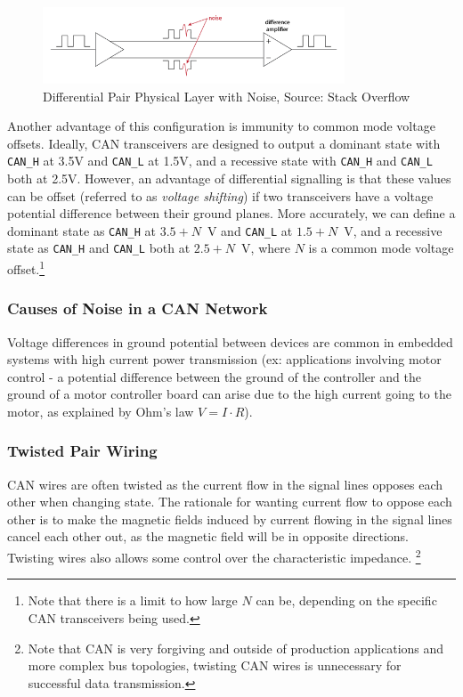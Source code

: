 \documentclass[main.tex]{subfiles}
\begin{document}
\begin{figure}[H]
    \centering
    \includegraphics[width=0.8\textwidth]{images/diff_pair_noise_immunity.png}
    \caption{Differential Pair Physical Layer with Noise, Source: Stack Overflow \cite{stackoverflow_diff_pair_noise}}
    \label{fig:diff-physical-layer-noise}
\end{figure}

\noindent Another advantage of this configuration is immunity to common mode voltage offsets. Ideally, CAN transceivers are designed to output a dominant state with \texttt{CAN\_H} at 3.5V and \texttt{CAN\_L} at 1.5V, and a recessive state with \texttt{CAN\_H} and \texttt{CAN\_L} both at 2.5V. However, an advantage of differential signalling is that these values can be offset (referred to as \textit{voltage shifting}) if two transceivers have a voltage potential difference between their ground planes. More accurately, we can define a dominant state as \texttt{CAN\_H} at \(3.5 + N\)~V and \texttt{CAN\_L} at \(1.5 + N\)~V, and a recessive state as \texttt{CAN\_H} and \texttt{CAN\_L} both at \(2.5 + N\)~V, where $N$ is a common mode voltage offset.\footnote{Note that there is a limit to how large $N$ can be, depending on the specific CAN transceivers being used.} \newline

\subsubsection{Causes of Noise in a CAN Network}
Voltage differences in ground potential between devices are common in embedded systems with high current power transmission (ex: applications involving motor control - a potential difference between the ground of the controller and the ground of a motor controller board can arise due to the high current going to the motor, as explained by Ohm's law $V = I \cdot R$).

\subsubsection{Twisted Pair Wiring}
\noindent CAN wires are often twisted as the current flow in the signal lines opposes each other when changing state. The rationale for wanting current flow to oppose each other is to make the magnetic fields induced by current flowing in the signal lines cancel each other out, as the magnetic field will be in opposite directions. Twisting wires also allows some control over the characteristic impedance. \footnote{Note that CAN is very forgiving and outside of production applications and more complex bus topologies, twisting CAN wires is unnecessary for successful data transmission.} %
\end{document}
